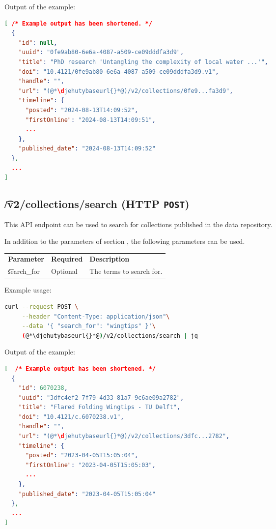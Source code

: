 Output of the example:
\begin{lstlisting}[language=JSON]
[ /* Example output has been shortened. */
  {
    "id": null,
    "uuid": "0fe9ab80-6e6a-4087-a509-ce09dddfa3d9",
    "title": "PhD research 'Untangling the complexity of local water ...'",
    "doi": "10.4121/0fe9ab80-6e6a-4087-a509-ce09dddfa3d9.v1",
    "handle": "",
    "url": "(@*\djehutybaseurl{}*@)/v2/collections/0fe9...fa3d9",
    "timeline": {
      "posted": "2024-08-13T14:09:52",
      "firstOnline": "2024-08-13T14:09:51",
      ...
    },
    "published_date": "2024-08-13T14:09:52"
  },
  ...
]
\end{lstlisting}

\subsection{\t{/v2/collections/search} (HTTP \texttt{POST})}

  This API endpoint can be used to search for collections published in
  the data repository.

  In addition to the parameters of section , the
  following parameters can be used.

\begin{tabularx}{\textwidth}{*{2}{!{\VRule[-1pt]}l}!{\VRule[-1pt]}X}
  \headrow
  \textbf{Parameter}   & \textbf{Required} & \textbf{Description}\\
  \t{search\_for}      & Optional          & The terms to search for.
\end{tabularx}

  Example usage:
\begin{lstlisting}[language=bash]
curl --request POST \
     --header "Content-Type: application/json"\
     --data '{ "search_for": "wingtips" }'\
     (@*\djehutybaseurl{}*@)/v2/collections/search | jq
\end{lstlisting}

  Output of the example:
\begin{lstlisting}[language=JSON]
[  /* Example output has been shortened. */
  {
    "id": 6070238,
    "uuid": "3dfc4ef2-7f79-4d33-81a7-9c6ae09a2782",
    "title": "Flared Folding Wingtips - TU Delft",
    "doi": "10.4121/c.6070238.v1",
    "handle": "",
    "url": "(@*\djehutybaseurl{}*@)/v2/collections/3dfc...2782",
    "timeline": {
      "posted": "2023-04-05T15:05:04",
      "firstOnline": "2023-04-05T15:05:03",
      ...
    },
    "published_date": "2023-04-05T15:05:04"
  },
  ...
]
\end{lstlisting}

